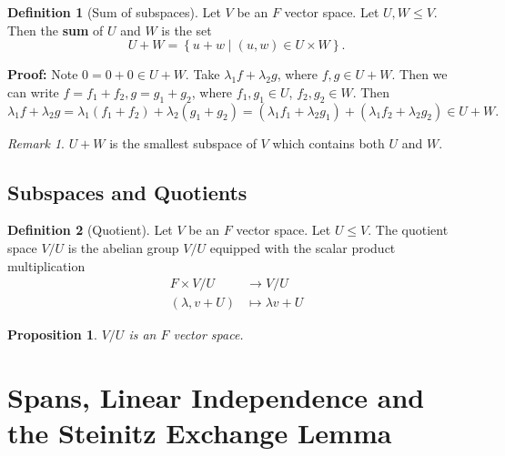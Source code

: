 \documentclass[12pt]{article}
\newtheorem{proposition}{Proposition}[section]
\theoremstyle{definition}
\newtheorem{definition}{Definition}[section]
\theoremstyle{remark}
\newtheorem*{remark}{Remark}
\begin{document}
\begin{definition}[Sum of subspaces]
	Let $V$ be an $F$ vector space. Let $U, W \leq V$. Then the \textbf{sum} of $U$ and $W$ is the set
	\[
		U + W = \left\{ u + w \mid (u, w) \in U \times W \right\}
	.\]
\end{definition}

\begin{adjustbox}{minipage = \columnwidth - 25.5pt, margin=1em, frame=1pt, margin=0em}
\textbf{Proof:} Note $0 = 0 + 0 \in U + W$. Take $\lambda_1 f + \lambda_2 g$, where $f, g \in U + W$. Then we can write $f = f_1 + f_2, g = g_1 + g_2$, where $f_1, g_1 \in U$, $f_2, g_2 \in W$. Then 
\[
	\lambda_1 f + \lambda_2 g = \lambda_1 (f_1 + f_2) + \lambda_2(g_1 + g_2) = (\lambda_1 f_1 + \lambda_2 g_1) + (\lambda_1 f_2 + \lambda_2 g_2) \in U + W
.\]
\end{adjustbox}

\begin{remark}
	$U + W$ is the smallest subspace of $V$ which contains both $U$ and $W$.
\end{remark}

\subsection{Subspaces and Quotients}%
\label{sub:subspaces_and_quotients}

\begin{definition}[Quotient]
	Let $V$ be an $F$ vector space. Let $U \leq V$. The quotient space $V / U$ is the abelian group $V/U$ equipped with the scalar product multiplication
	\begin{align*}
		F \times V/U &\to V/U \\
		(\lambda, v + U) &\mapsto \lambda v + U
	\end{align*}
\end{definition}

\begin{proposition}
	$V/U$ is an $F$ vector space.
\end{proposition}

\newpage

\section{Spans, Linear Independence and the Steinitz Exchange Lemma}%
\label{sec:spans_linear_independence_and_the_steinitz_exchange_lemma}
\end{document}
